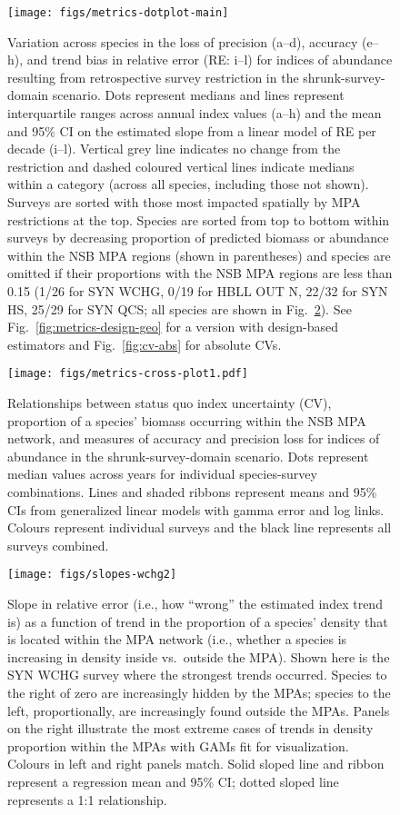 \documentclass[12pt]{article}
\begin{document}
\begin{figure}[htb]
    \centering
    \texttt{[image: figs/metrics-dotplot-main]}
    \caption{Variation across species in the loss of precision (a--d), accuracy (e--h), and trend bias in relative error (RE: i--l) for indices of abundance resulting from retrospective survey restriction in the shrunk-survey-domain scenario. Dots represent medians and lines represent interquartile ranges across annual index values (a--h) and the mean and 95\% CI on the estimated slope from a linear model of RE per decade (i--l). Vertical grey line indicates no change from the restriction and dashed coloured vertical lines indicate medians within a category (across all species, including those not shown). Surveys are sorted with those most impacted spatially by MPA restrictions at the top. Species are sorted from top to bottom within surveys by decreasing proportion of predicted biomass or abundance within the NSB MPA regions (shown in parentheses) and species are omitted if their proportions with the NSB MPA regions are less than 0.15 (1/26 for SYN WCHG, 0/19 for HBLL OUT N, 22/32 for SYN HS, 25/29 for SYN QCS; all species are shown in Fig.~\ref{fig:covariates}). See Fig.~\ref{fig:metrics-design-geo} for a version with design-based estimators and Fig.~\ref{fig:cv-abs} for absolute CVs. }
    \label{fig:dotplot}
\end{figure}

\begin{figure}[htb]
  \centering
  \texttt{[image: figs/metrics-cross-plot1.pdf]}
  \caption{Relationships between status quo index uncertainty (CV), proportion of a species' biomass occurring within the NSB MPA network, and measures of accuracy and precision loss for indices of abundance in the shrunk-survey-domain scenario. Dots represent median values across years for individual species-survey combinations. Lines and shaded ribbons represent means and 95\% CIs from generalized linear models with gamma error and log links. Colours represent individual surveys and the black line represents all surveys combined.}
  \label{fig:covariates}
\end{figure}

\clearpage

\begin{figure}[htb]
    \centering
    \texttt{[image: figs/slopes-wchg2]}
    \caption{Slope in relative error (i.e., how ``wrong'' the estimated index trend is) as a function of trend in the proportion of a species' density that is located within the MPA network (i.e., whether a species is increasing in density inside vs.\ outside the MPA). Shown here is the SYN WCHG survey where the strongest trends occurred. Species to the right of zero are increasingly hidden by the MPAs; species to the left, proportionally, are increasingly found outside the MPAs. Panels on the right illustrate the most extreme cases of trends in density proportion within the MPAs with GAMs fit for visualization. Colours in left and right panels match. Solid sloped line and ribbon represent a regression mean and 95\% CI; dotted sloped line represents a 1:1 relationship.}
    \label{fig:slopes}
\end{figure}
\end{document}
